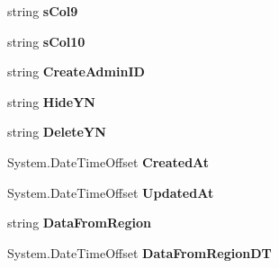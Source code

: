\begin{DoxyCompactItemize}
\item 
string {\bfseries s\+Col9}\hypertarget{a00135_a627c7821c88a3d7359e9b7227361614d}{}\label{a00135_a627c7821c88a3d7359e9b7227361614d}

\item 
string {\bfseries s\+Col10}\hypertarget{a00135_a86e1771053cc213713c1a3ba03224326}{}\label{a00135_a86e1771053cc213713c1a3ba03224326}

\item 
string {\bfseries Create\+Admin\+ID}\hypertarget{a00135_ad14e75fb48158acd9b45fe421e7f4e04}{}\label{a00135_ad14e75fb48158acd9b45fe421e7f4e04}

\item 
string {\bfseries Hide\+YN}\hypertarget{a00135_a14bf2df226ccf7a84e515754456a5a3c}{}\label{a00135_a14bf2df226ccf7a84e515754456a5a3c}

\item 
string {\bfseries Delete\+YN}\hypertarget{a00135_aaef00dd5ccf591b115277529dd012fe9}{}\label{a00135_aaef00dd5ccf591b115277529dd012fe9}

\item 
System.\+Date\+Time\+Offset {\bfseries Created\+At}\hypertarget{a00135_ad6c333ffdee0e44e20947d7d8b6238b7}{}\label{a00135_ad6c333ffdee0e44e20947d7d8b6238b7}

\item 
System.\+Date\+Time\+Offset {\bfseries Updated\+At}\hypertarget{a00135_a8997d54125da7bb3fda21bdbb43361a8}{}\label{a00135_a8997d54125da7bb3fda21bdbb43361a8}

\item 
string {\bfseries Data\+From\+Region}\hypertarget{a00135_a09a7ce3c727a6c27264fd47449f73e22}{}\label{a00135_a09a7ce3c727a6c27264fd47449f73e22}

\item 
System.\+Date\+Time\+Offset {\bfseries Data\+From\+Region\+DT}\hypertarget{a00135_aabf4409343c5c7f07328ae569d10942c}{}\label{a00135_aabf4409343c5c7f07328ae569d10942c}


\end{DoxyCompactItemize}
